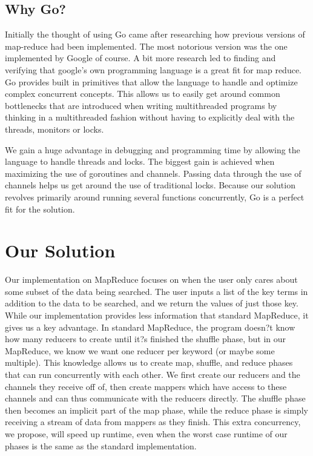 \documentclass[report]{IEEEtran}
\begin{document}
\subsection {Why Go?}
Initially the thought of using Go came after researching how previous versions of map-reduce had been implemented. The most notorious version was the one implemented by Google of course. A bit more research led to finding and verifying that google's own programming language is a great fit for map reduce. Go provides built in primitives that allow the language to handle and optimize complex concurrent concepts. This allows us to easily get around common bottlenecks that are introduced when writing multithreaded programs by thinking in a multithreaded fashion without having to explicitly deal with the threads, monitors or locks.

We gain a huge advantage in debugging and programming time by allowing the language to handle threads and locks. The biggest gain is achieved when maximizing the use of goroutines and channels. Passing data through the use of channels helps us get around the use of traditional locks. Because our solution revolves primarily around running several functions concurrently, Go is a perfect fit for the solution. 


\section{Our Solution}

Our implementation on MapReduce focuses on when the user only cares about some subset of the data being searched. The user inputs a list of the key terms in addition to the data to be searched, and we return the values of just those key. While our implementation provides less information that standard MapReduce, it gives us a key advantage. In standard MapReduce, the program doesn?t know how many reducers to create until it?s finished the shuffle phase, but in our MapReduce, we know we want one reducer per keyword (or maybe some multiple). This knowledge allows us to create map, shuffle, and reduce phases that can run concurrently with each other. We first create our reducers and the channels they receive off of, then create mappers which have access to these channels and can thus communicate with the reducers directly. The shuffle phase then becomes an implicit part of the map phase, while the reduce phase is simply receiving a stream of data from mappers as they finish. This extra concurrency, we propose, will speed up runtime, even when the worst case runtime of our phases is the same as the standard implementation. 
\end{document}
